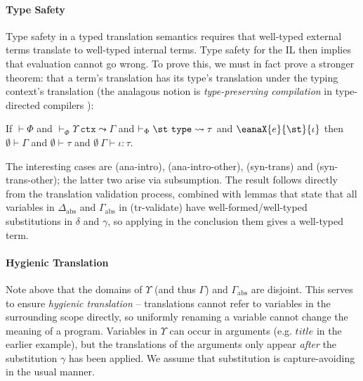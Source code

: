\paragraph{Type Safety}
Type safety in a typed translation semantics requires that well-typed external terms translate to well-typed internal terms. Type safety for the IL \cite{pfpl} then implies that evaluation cannot go wrong. To prove this, we must in fact prove a stronger theorem: that a term's translation has its type's translation under the typing context's translation (the analagous notion is \emph{type-preserving compilation} in type-directed compilers \cite{tarditi+:til-OLD}):%

\vspace{-4px}\begin{theorem}
\label{thm:type-preserving-translation}
If $\vdash \Phi$ and $\vdash_\Phi \Upsilon~\mathtt{ctx} \leadsto \Gamma$ and $\vdash_\Phi \st~\mathtt{type} \leadsto \tau$ and $\eanaX{e}{\st}{\iota}$ then $\emptyset \vdash \Gamma$ and $\emptyset \vdash \tau$ and $\emptyset~\Gamma \vdash \iota : \tau$.
\end{theorem}
\begin{proof-sketch}
The interesting cases are (ana-intro), (ana-intro-other), (syn-trans) and (syn-trans-other); the latter two arise via subsumption. The result follows directly from the translation validation process, combined with lemmas that state that all variables in $\Delta_\text{abs}$ and $\Gamma_\text{abs}$ in (tr-validate) have well-formed/well-typed substitutions in $\delta$ and $\gamma$,  so applying in the conclusion them gives a well-typed term.
\end{proof-sketch}

\paragraph{Hygienic Translation} 
Note above that the domains of $\Upsilon$ (and thus $\Gamma$)  and $\Gamma_\text{abs}$ are disjoint. This serves to ensure \emph{hygienic translation} -- translations cannot refer to variables in the surrounding scope directly, so uniformly renaming a variable cannot change the meaning of a program. Variables in $\Upsilon$ can  occur in arguments (e.g. $title$ in the earlier example), but the translations of the arguments only appear \emph{after} the substitution $\gamma$ has been applied. We assume that substitution is capture-avoiding in the usual manner. %


